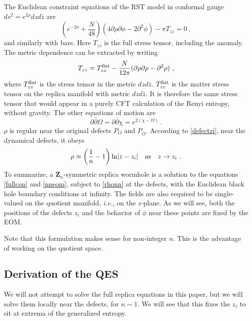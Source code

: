 \documentclass[12pt,oneside,letterpaper]{article}
\newcommand{\p}{\partial}
\newcommand{\be}{\begin{equation}}
\newcommand{\ee}{\end{equation}}
\def\be{\begin{eqnarray}}
\def\ee{\end{eqnarray}}
\def\be{\begin{equation}}
\def\ee{\end{equation}}
\def\log{{\rm ln}}
\renewcommand{\p}{\partial}
\numberwithin{equation}{section}
\def \be {\begin{equation}}
\def \ee {\end{equation}}
\begin{document}
The Euclidean constraint equations of the RST model in conformal gauge $ds^2 = e^{2\rho}dz d\bar{z}$ are
\be\label{fullcon}
\left( e^{-2\phi} + \frac{N}{48} \right) (4 \p \rho \p \phi - 2 \p^2 \phi) -\pi T_{zz} = 0 \ ,
\ee
and similarly with bars. Here $T_{zz}$ is the full stress tensor, including the anomaly. The metric dependence can be extracted by writing
\be
T_{zz} = T_{zz}^{\rm flat}  -  \frac{N}{12 \pi}(\p \rho \p \rho - \p^2 \rho)  \ ,
\ee
where $T_{zz}^{\rm flat}$ is the stress tensor in the metric $dz d\bar{z}$. $T_{zz}^{\rm flat}$ is the matter stress tensor on the replica manifold with metric $dz d\bar{z}$. It is therefore the same stress tensor that would appear in a purely CFT calculation of the Renyi entropy, without gravity. The other equations of motion are
\be\label{nneom}
\p \bar{\p} \Omega = \p \bar{\p} \chi = e^{2(\chi - \Omega)} \ .
\ee
$\rho$ is regular near the original defects $P_O$ and $P_{\bar{O}}$. According to \eqref{defectzi}, near the dynamical defects, it obeys
\be\label{rhonn}
\rho \approx \left( \frac{1}{n} - 1\right)\log |z-z_i| \quad \mbox{as}\quad z \to z_i \ .
\ee
To summarize, a $\mathbf{Z}_n$-symmetric replica wormhole is a solution to the equations \eqref{fullcon} and \eqref{nneom}, subject to \eqref{rhonn} at the defects, with the Euclidean black hole boundary conditions at infinity. The fields are also required to be single-valued on the quotient manifold, \textit{i.e.}, on the $z$-plane. As we will see, both the positions of the defects $z_i$  and the behavior of $\phi$ near these points are fixed by the EOM. 

Note that this formulation makes sense for non-integer $n$. This is the advantage of working on the quotient space.

\newcommand{\bz}{\bar{z}}
\newcommand{\bw}{\bar{w}}
\subsection{Derivation of the QES}

We will not attempt to solve the full replica equations in this paper, but we will solve them locally near the defects, for $n \sim 1$. We will see that this fixes the $z_i$ to sit at extrema of the generalized entropy. 
\end{document}
